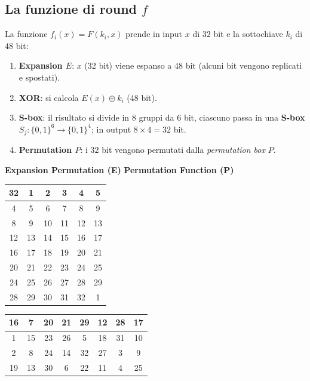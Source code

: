 \subsection{La funzione di round $f$}
La funzione $ f_i(x) = F(k_i, x) $ prende in input $ x $ di $ 32 $ bit e la sottochiave $ k_i $ di $ 48 $ bit:
\begin{enumerate}
  \item \textbf{Expansion $ E $}: $ x $ (32 bit) viene espanso a $ 48 $ bit (alcuni bit vengono replicati e spostati).
  \item \textbf{XOR}: si calcola $ E(x) \oplus k_i $ (48 bit).
  \item \textbf{S-box}: il risultato si divide in $ 8 $ gruppi da $ 6 $ bit, ciascuno passa in una \textbf{S-box} $ S_j: \{0,1\}^6 \to \{0,1\}^4 $; in output $ 8 \times 4 = 32 $ bit.
  \item \textbf{Permutation $ P $}: i $ 32 $ bit vengono permutati dalla \textit{permutation box} $ P $.
\end{enumerate}
\begin{center}
  \footnotesize
  \textbf{Expansion Permutation (E)} \hspace{2em} \textbf{Permutation Function (P)}\\[2pt]
  \begin{tabular}{|c|c|c|c|c|c|}
    \hline
    32 & 1 & 2 & 3 & 4 & 5 \\ \hline
    4 & 5 & 6 & 7 & 8 & 9 \\ \hline
    8 & 9 & 10 & 11 & 12 & 13 \\ \hline
    12 & 13 & 14 & 15 & 16 & 17 \\ \hline
    16 & 17 & 18 & 19 & 20 & 21 \\ \hline
    20 & 21 & 22 & 23 & 24 & 25 \\ \hline
    24 & 25 & 26 & 27 & 28 & 29 \\ \hline
    28 & 29 & 30 & 31 & 32 & 1 \\ \hline
  \end{tabular}
  \qquad
  \begin{tabular}{|c|c|c|c|c|c|c|c|}
    \hline
    16 & 7 & 20 & 21 & 29 & 12 & 28 & 17 \\ \hline
    1 & 15 & 23 & 26 & 5 & 18 & 31 & 10 \\ \hline
    2 & 8 & 24 & 14 & 32 & 27 & 3 & 9 \\ \hline
    19 & 13 & 30 & 6 & 22 & 11 & 4 & 25 \\ \hline
  \end{tabular}
\end{center}

